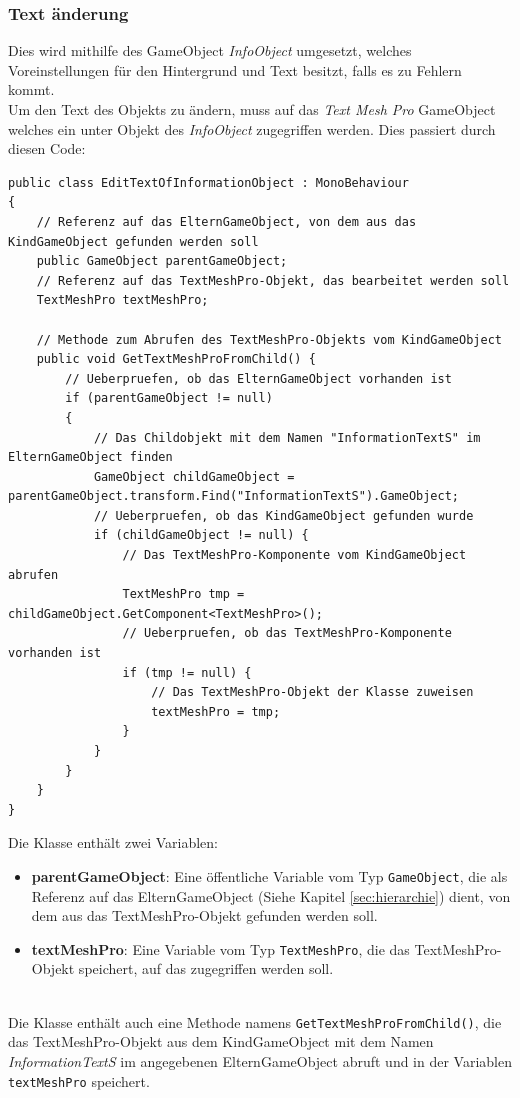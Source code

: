 \subsubsection*{Text änderung}
Dies wird mithilfe des GameObject \textit{InfoObject} umgesetzt, welches Voreinstellungen für den Hintergrund und Text besitzt, falls es zu Fehlern kommt. \\
Um den Text des Objekts zu ändern, muss auf das \textit{Text Mesh Pro} GameObject welches ein unter Objekt des \textit{InfoObject} zugegriffen werden. Dies passiert durch diesen Code:
\begin{lstlisting}[style=csharp, caption={Kind vom GameObject bekommen}, label=code:]
public class EditTextOfInformationObject : MonoBehaviour
{
    // Referenz auf das ElternGameObject, von dem aus das KindGameObject gefunden werden soll
    public GameObject parentGameObject;
    // Referenz auf das TextMeshPro-Objekt, das bearbeitet werden soll
    TextMeshPro textMeshPro;

    // Methode zum Abrufen des TextMeshPro-Objekts vom KindGameObject
    public void GetTextMeshProFromChild() {
        // Ueberpruefen, ob das ElternGameObject vorhanden ist
        if (parentGameObject != null)
        {
            // Das Childobjekt mit dem Namen "InformationTextS" im ElternGameObject finden
            GameObject childGameObject = parentGameObject.transform.Find("InformationTextS").GameObject;
            // Ueberpruefen, ob das KindGameObject gefunden wurde
            if (childGameObject != null) {
                // Das TextMeshPro-Komponente vom KindGameObject abrufen
                TextMeshPro tmp = childGameObject.GetComponent<TextMeshPro>();
                // Ueberpruefen, ob das TextMeshPro-Komponente vorhanden ist
                if (tmp != null) {
                    // Das TextMeshPro-Objekt der Klasse zuweisen
                    textMeshPro = tmp;
                }
            }
        }
    }
}
\end{lstlisting}
Die Klasse enthält zwei Variablen:

\begin{itemize}
    \item \textbf{parentGameObject}: Eine öffentliche Variable vom Typ \texttt{GameObject}, die als Referenz auf das ElternGameObject (Siehe Kapitel \ref{sec:hierarchie}) dient, von dem aus das TextMeshPro-Objekt gefunden werden soll.
    \item \textbf{textMeshPro}: Eine Variable vom Typ \texttt{TextMeshPro}, die das TextMeshPro-Objekt speichert, auf das zugegriffen werden soll.
\end{itemize}
\\
Die Klasse enthält auch eine Methode namens \texttt{GetTextMeshProFromChild()}, die das TextMeshPro-Objekt aus dem KindGameObject mit dem Namen \textit{InformationTextS} im angegebenen ElternGameObject abruft und in der Variablen \texttt{textMeshPro} speichert.


